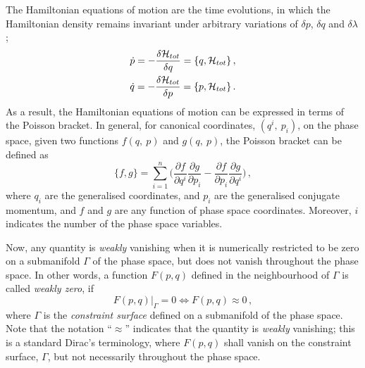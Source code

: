 \documentclass[a4paper,12pt]{article}
\newcommand{\be}{\begin{equation}}
\newcommand{\ee}{\end{equation}}
\newcommand{\Ga}{\Gamma}
\newcommand{\cH}{{\cal H}}
\newcommand{\+}{^{\dagger}}
\newcommand{\2}{\frac{1}{2}}
\newcommand{\3}{\frac{1}{3}}
\newcommand{\4}{\frac{1}{4}}
\newcommand{\6}{\frac{1}{6}}
\newcommand{\8}{\frac{1}{8}}
\begin{document}
The Hamiltonian equations of motion are the time evolutions, in which the Hamiltonian density remains invariant under arbitrary variations of $\delta p$, $\delta q$ and $\delta \lambda$ ; 
\begin{eqnarray}
\dot{p}=-\frac{\delta \mathcal{H}_{tot}}{\delta q}=\{q,\cH_{tot}\}\,,\\
\dot{q}=-\frac{\delta \mathcal{H}_{tot}}{\delta p}=\{p,\cH_{tot}\}\,.
\end{eqnarray}
As a result, the Hamiltonian equations of motion can be expressed in terms of the Poisson bracket.
In general, for canonical coordinates, $(q^i,~p_i)$,
on the phase space, given two functions $f(q,~p)$ and $g(q,~p)$, the Poisson
bracket can be defined as 
\begin{equation}\label{poisdef}
\{f,g\}=\sum^{n}_{i=1}\Big(\frac{\partial f}{\partial q^{i}}\frac{\partial
g}{\partial p_i}-\frac{\partial f}{\partial p_i}\frac{\partial
g}{\partial q^{i}}\Big)\,,
\end{equation} 
where $q_i$ are the generalised coordinates, and $p_i$ are the generalised conjugate momentum, and $f$ and $g$ are any function of phase space coordinates. Moreover, $i$ indicates the number of the phase space variables.

Now, any quantity is \textit{weakly} vanishing when it is numerically restricted to be zero on a submanifold $\Ga$ of the phase space, but does not vanish throughout the phase space. In other words, a function $F(p,q)$ defined in the neighbourhood of $\Ga$ is called \textit{weakly zero}, if
\be
F(p,q) |_{\Ga}=0\Longleftrightarrow F(p,q) \approx 0 \,,
\ee
where $\Ga$ is the \textit{constraint surface} defined on a submanifold of the phase space. Note that the notation ``$\approx$'' indicates that the quantity is \textit{weakly} vanishing; this is a standard Dirac's terminology, where $F(p,q)$ shall vanish on the constraint surface, $\Ga$, but not necessarily throughout the phase space.
\end{document}
